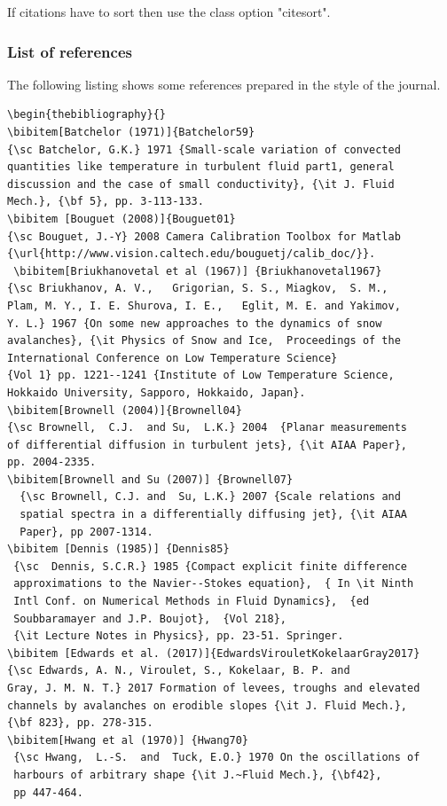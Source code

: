 \documentclass[lineno]{JFM-FLM_Au}
\begin{document}
If citations have to sort then use the class option "citesort".

\subsubsection{List of references}\label{fullref}

The following listing shows some references prepared in the style of the
journal.
%
\begin{verbatim}
\begin{thebibliography}{}
\bibitem[Batchelor (1971)]{Batchelor59}
{\sc Batchelor, G.K.} 1971 {Small-scale variation of convected
quantities like temperature in turbulent fluid part1, general
discussion and the case of small conductivity}, {\it J. Fluid
Mech.}, {\bf 5}, pp. 3-113-133.
\bibitem [Bouguet (2008)]{Bouguet01}
{\sc Bouguet, J.-Y} 2008 Camera Calibration Toolbox for Matlab
{\url{http://www.vision.caltech.edu/bouguetj/calib_doc/}}.
 \bibitem[Briukhanovetal et al (1967)] {Briukhanovetal1967}
{\sc Briukhanov, A. V.,   Grigorian, S. S., Miagkov,  S. M.,
Plam, M. Y., I. E. Shurova, I. E.,   Eglit, M. E. and Yakimov,
Y. L.} 1967 {On some new approaches to the dynamics of snow
avalanches}, {\it Physics of Snow and Ice,  Proceedings of the
International Conference on Low Temperature Science}
{Vol 1} pp. 1221--1241 {Institute of Low Temperature Science,
Hokkaido University, Sapporo, Hokkaido, Japan}.
\bibitem[Brownell (2004)]{Brownell04}
{\sc Brownell,  C.J.  and Su,  L.K.} 2004  {Planar measurements
of differential diffusion in turbulent jets}, {\it AIAA Paper},
pp. 2004-2335.
\bibitem[Brownell and Su (2007)] {Brownell07}
  {\sc Brownell, C.J. and  Su, L.K.} 2007 {Scale relations and
  spatial spectra in a differentially diffusing jet}, {\it AIAA
  Paper}, pp 2007-1314.
\bibitem [Dennis (1985)] {Dennis85}
 {\sc  Dennis, S.C.R.} 1985 {Compact explicit finite difference
 approximations to the Navier--Stokes equation},  { In \it Ninth
 Intl Conf. on Numerical Methods in Fluid Dynamics},  {ed
 Soubbaramayer and J.P. Boujot},  {Vol 218},
 {\it Lecture Notes in Physics}, pp. 23-51. Springer.
\bibitem [Edwards et al. (2017)]{EdwardsVirouletKokelaarGray2017}
{\sc Edwards, A. N., Viroulet, S., Kokelaar, B. P. and
Gray, J. M. N. T.} 2017 Formation of levees, troughs and elevated
channels by avalanches on erodible slopes {\it J. Fluid Mech.},
{\bf 823}, pp. 278-315.
\bibitem[Hwang et al (1970)] {Hwang70}
 {\sc Hwang,  L.-S.  and  Tuck, E.O.} 1970 On the oscillations of
 harbours of arbitrary shape {\it J.~Fluid Mech.}, {\bf42},
 pp 447-464.

\end{verbatim}
\end{document}
